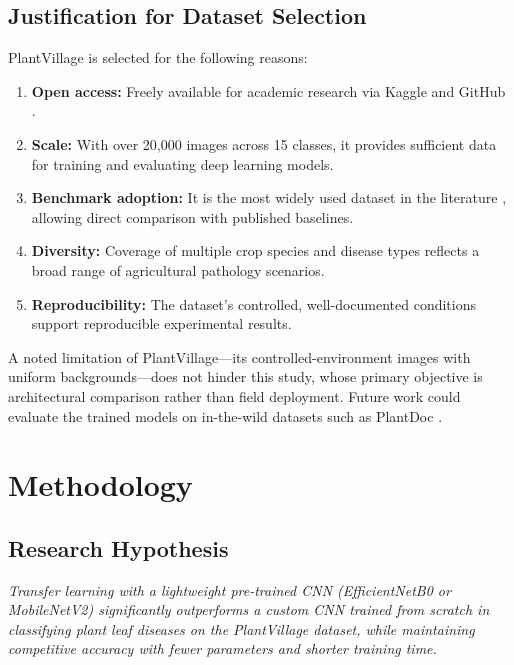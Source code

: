 \documentclass[10pt,twocolumn]{article}
\begin{document}
\subsection{Justification for Dataset Selection}

PlantVillage is selected for the following reasons:
\begin{enumerate}
  \item \textbf{Open access:} Freely available for academic research via Kaggle and GitHub \cite{HughesSalathe2015}.
  \item \textbf{Scale:} With over 20,000 images across 15 classes, it provides sufficient data for training and evaluating deep learning models.
  \item \textbf{Benchmark adoption:} It is the most widely used dataset in the literature \cite{AIReview2024}, allowing direct comparison with published baselines.
  \item \textbf{Diversity:} Coverage of multiple crop species and disease types reflects a broad range of agricultural pathology scenarios.
  \item \textbf{Reproducibility:} The dataset's controlled, well-documented conditions support reproducible experimental results.
\end{enumerate}

A noted limitation of PlantVillage—its controlled-environment images with uniform backgrounds—does not hinder this study, whose primary objective is architectural comparison rather than field deployment. Future work could evaluate the trained models on in-the-wild datasets such as PlantDoc \cite{PlantDoc2020}.

\section{Methodology}

\subsection{Research Hypothesis}

\textit{Transfer learning with a lightweight pre-trained CNN (EfficientNetB0 or MobileNetV2) significantly outperforms a custom CNN trained from scratch in classifying plant leaf diseases on the PlantVillage dataset, while maintaining competitive accuracy with fewer parameters and shorter training time.}
\end{document}
